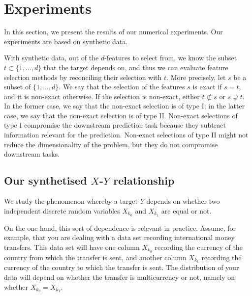 \section{Experiments}
In this section,
we present the results of our numerical experiments.
Our experiments are based
on synthetic data.


With synthetic data, 
out 
of the $d$-features to select from,
we know the subset 
$t \subset \lbrace 1, \dots, d\rbrace$
that the target depends on,
and thus
we can evaluate feature selection methods
by reconciling their selection with $t$.
More precisely,
let 
$s$ 
be a subset of 
$\lbrace1, \dots, d\rbrace$.
We say that 
the selection of the features 
$s$ is exact if $s=t$,
and it is non-exact otherwise. 
If the selection is non-exact,
either 
$t \not \subset s$
or
$s \supsetneq t$.
In the former case, 
we say that the non-exact selection is of type I;
in the latter case,
we say that the non-exact selection is of type II. 
Non-exact selections of type I 
compromise the downstream prediction task 
because 
they subtract information relevant for the prediction.
Non-exact selections of type II
might not reduce the dimensionality of the problem,
but they do not compromise downstream tasks. 


\subsection{Our synthetised $X$-$Y$ relationship}
We study the phenomenon
whereby
a target $Y$ depends
on whether
two independent discrete random variables 
$X_{k_0}$ 
and
$X_{k_1}$
are equal or not.

On the one hand, 
this sort of dependence is relevant in practice.
Assume, 
for example,
that 
you are dealing with a data set recording 
international money transfers.
This data set will have 
one column $X_{k_0}$ recording 
the currency of the country from which the transfer is sent,
and another column $X_{k_1}$ recording
the currency of the country to which the transfer is sent.
The distribution of your data will
depend on whether the transfer is multicurrency or not, 
namely on whether $X_{k_0} = X_{k_1}$.

